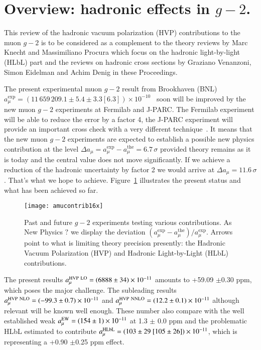 \documentclass[epj,onecolumn]{webofc}
\newcommand{\power}[1]{\times 10^{#1} }
\newcommand{\amu}{a_\mu }
\newcommand{\amuexp}{a_\mu^{\mathrm{exp}}}
\newcommand{\amuthe}{a_\mu^{\mathrm{the}}}
\begin{document}
\section{Overview: hadronic effects in $g-2$.}
\label{intro}
This review of the hadronic vacuum polarization (HVP) contributions to the muon $g-2$ is to be
considered as a complement to the theory reviews by Marc Knecht and Massimiliano Procura
which focus on the hadronic light-by-light (HLbL) part and the
reviews on hadronic cross sections by Graziano Venanzoni, Simon
Eidelman and Achim Denig in these Proceedings.

The present experimental muon $g-2$ result from Brookhaven (BNL)
$\amuexp=(11\,659\,209.1\pm5.4\pm3.3[6.3])\power{-10}$~\cite{BNLfinal} soon will be
improved by the new muon $g-2$ experiments at Fermilab and J-PARC. The
Fermilab experiment will be able to reduce the error by a factor 4, the
J-PARC experiment will provide an important cross check with a very
different technique~\cite{Hertzog15}. It means that
the new muon $g-2$ experiments are expected to establish a possible new
physics contribution at the level $\Delta \amu=\amuexp-\amuthe=6.7\,
\sigma$ provided theory remains as it is today and the central value does
not move significantly. If we achieve a reduction of the hadronic
uncertainty by factor 2 we would arrive at $
\Delta \amu =11.6\,\sigma$. That's what we hope to
achieve. Figure~\ref{fig:contributions17} illustrates the present
status and what has been achieved so far.
\begin{figure}[h]
\centering
\texttt{[image: amucontrib16x]}
\caption{Past and future $g-2$ experiments testing various
contributions. As New Physics $?$ we display the
deviation $
(a_\mu^\mathrm{exp}-a_\mu^\mathrm{the})/a_\mu^\mathrm{exp}$. Arrows
point to what is limiting theory precision presently: the Hadronic Vacuum
Polarization (HVP) and Hadronic Light-by-Light (HLbL) contributions.}
\label{fig:contributions17}
\end{figure}
The present results $a_\mu^{\rm HVP \ LO}  = (6888\pm34) \times 10^{-11}$ amounts to +59.09
$\pm$0.30 ppm, which poses the major challenge.  The subleading
results $a_\mu^{\rm HVP \ NLO}= (-99.3\pm 0.7) \times 10^{-11}$ and
$a_\mu^{\rm HVP \ NNLO} = (12.2\pm 0.1) \times 10^{-11}$ although
relevant will be known well enough. These number also compare with the
well established weak $a_\mu^{{\rm EW}}= (154\pm 1) \times 10^{-11}$
at 1.3 $\pm$ 0.0 ppm
and the problematic HLbL estimated to contribute $a_\mu^{{\rm
HLbL}}= (103 \pm 29~[105\pm26])\times 10^{-11}$, which is
representing a +0.90 $\pm$0.25 ppm effect.\\
\end{document}
